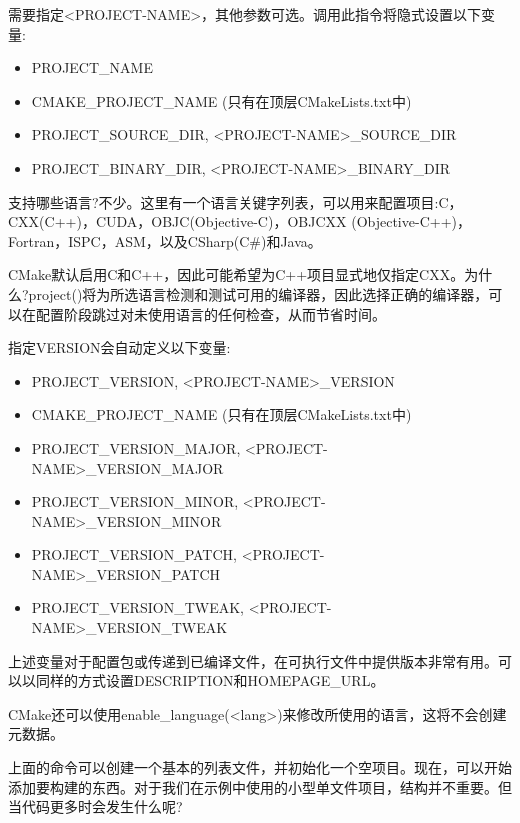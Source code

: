 需要指定<PROJECT-NAME>，其他参数可选。调用此指令将隐式设置以下变量:

\begin{itemize}
\item 
PROJECT\_NAME

\item 
CMAKE\_PROJECT\_NAME (只有在顶层CMakeLists.txt中)

\item 
PROJECT\_SOURCE\_DIR, <PROJECT-NAME>\_SOURCE\_DIR

\item 
PROJECT\_BINARY\_DIR, <PROJECT-NAME>\_BINARY\_DIR
\end{itemize}

支持哪些语言?不少。这里有一个语言关键字列表，可以用来配置项目:C，CXX(C++)，CUDA，OBJC(Objective-C)，OBJCXX (Objective-C++)，Fortran，ISPC，ASM，以及CSharp(C\#)和Java。

CMake默认启用C和C++，因此可能希望为C++项目显式地仅指定CXX。为什么?project()将为所选语言检测和测试可用的编译器，因此选择正确的编译器，可以在配置阶段跳过对未使用语言的任何检查，从而节省时间。

指定VERSION会自动定义以下变量:

\begin{itemize}
\item 
PROJECT\_VERSION, <PROJECT-NAME>\_VERSION

\item 
CMAKE\_PROJECT\_NAME (只有在顶层CMakeLists.txt中)

\item 
PROJECT\_VERSION\_MAJOR, <PROJECT-NAME>\_VERSION\_MAJOR

\item 
PROJECT\_VERSION\_MINOR, <PROJECT-NAME>\_VERSION\_MINOR

\item 
PROJECT\_VERSION\_PATCH, <PROJECT-NAME>\_VERSION\_PATCH

\item 
PROJECT\_VERSION\_TWEAK, <PROJECT-NAME>\_VERSION\_TWEAK
\end{itemize}


上述变量对于配置包或传递到已编译文件，在可执行文件中提供版本非常有用。可以以同样的方式设置DESCRIPTION和HOMEPAGE\_URL。

CMake还可以使用enable\_language(<lang>)来修改所使用的语言，这将不会创建元数据。

上面的命令可以创建一个基本的列表文件，并初始化一个空项目。现在，可以开始添加要构建的东西。对于我们在示例中使用的小型单文件项目，结构并不重要。但当代码更多时会发生什么呢?



